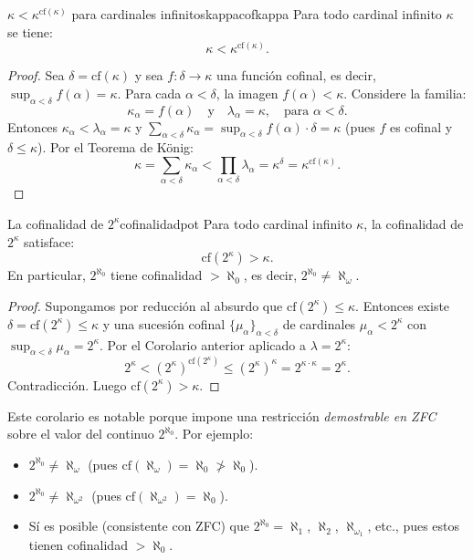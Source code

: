 \begin{corolario}{$\kappa < \kappa^{\mathrm{cf}(\kappa)}$ para cardinales infinitos}{kappacofkappa}
Para todo cardinal infinito $\kappa$ se tiene:
\[
  \kappa < \kappa^{\mathrm{cf}(\kappa)}.
\]
\end{corolario}

\begin{proof}
Sea $\delta = \mathrm{cf}(\kappa)$ y sea $f \colon \delta \to \kappa$ una función cofinal, es decir, $\sup_{\alpha < \delta} f(\alpha) = \kappa$. Para cada $\alpha < \delta$, la imagen $f(\alpha) < \kappa$. Considere la familia:
\[
  \kappa_\alpha = f(\alpha) \quad \text{y} \quad \lambda_\alpha = \kappa, \quad \text{para } \alpha < \delta.
\]
Entonces $\kappa_\alpha < \lambda_\alpha = \kappa$ y $\sum_{\alpha < \delta} \kappa_\alpha = \sup_{\alpha < \delta} f(\alpha) \cdot \delta = \kappa$ (pues $f$ es cofinal y $\delta \leq \kappa$). Por el Teorema de König:
\[
  \kappa = \sum_{\alpha < \delta} \kappa_\alpha < \prod_{\alpha < \delta} \lambda_\alpha = \kappa^\delta = \kappa^{\mathrm{cf}(\kappa)}.
\]
\end{proof}

\begin{corolario}{La cofinalidad de $2^\kappa$}{cofinalidadpot}
Para todo cardinal infinito $\kappa$, la cofinalidad de $2^\kappa$ satisface:
\[
  \mathrm{cf}(2^\kappa) > \kappa.
\]
En particular, $2^{\aleph_0}$ tiene cofinalidad $> \aleph_0$, es decir, $2^{\aleph_0} \neq \aleph_\omega$.
\end{corolario}

\begin{proof}
Supongamos por reducción al absurdo que $\mathrm{cf}(2^\kappa) \leq \kappa$. Entonces existe $\delta = \mathrm{cf}(2^\kappa) \leq \kappa$ y una sucesión cofinal $\{\mu_\alpha\}_{\alpha < \delta}$ de cardinales $\mu_\alpha < 2^\kappa$ con $\sup_{\alpha < \delta} \mu_\alpha = 2^\kappa$. Por el Corolario anterior aplicado a $\lambda = 2^\kappa$:
\[
  2^\kappa < (2^\kappa)^{\mathrm{cf}(2^\kappa)} \leq (2^\kappa)^\kappa = 2^{\kappa \cdot \kappa} = 2^\kappa.
\]
Contradicción. Luego $\mathrm{cf}(2^\kappa) > \kappa$.
\end{proof}

\begin{importante}
Este corolario es notable porque impone una restricción \emph{demostrable en ZFC} sobre el valor del continuo $2^{\aleph_0}$. Por ejemplo:
\begin{itemize}[leftmargin=2em]
  \item $2^{\aleph_0} \neq \aleph_\omega$ (pues $\mathrm{cf}(\aleph_\omega) = \aleph_0 \not> \aleph_0$).
  \item $2^{\aleph_0} \neq \aleph_{\omega^2}$ (pues $\mathrm{cf}(\aleph_{\omega^2}) = \aleph_0$).
  \item Sí es posible (consistente con ZFC) que $2^{\aleph_0} = \aleph_1$, $\aleph_2$, $\aleph_{\omega_1}$, etc., pues estos tienen cofinalidad $> \aleph_0$.
\end{itemize}
\end{importante}

